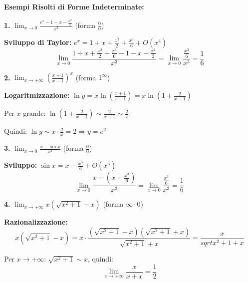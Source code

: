 \begin{esempio}
\textbf{Esempi Risolti di Forme Indeterminate:}

\textbf{1.} $\lim_{x \to 0} \frac{e^x - 1 - x - \frac{x^2}{2}}{x^3}$ (forma $\frac{0}{0}$)

\textbf{Sviluppo di Taylor:} $e^x = 1 + x + \frac{x^2}{2} + \frac{x^3}{6} + O(x^4)$
\[ \lim_{x \to 0} \frac{1 + x + \frac{x^2}{2} + \frac{x^3}{6} - 1 - x - \frac{x^2}{2}}{x^3} = \lim_{x \to 0} \frac{\frac{x^3}{6}}{x^3} = \frac{1}{6} \]

\textbf{2.} $\lim_{x \to +\infty} \left(\frac{x+1}{x-1}\right)^x$ (forma $1^{\infty}$)

\textbf{Logaritmizzazione:} $\ln y = x \ln\left(\frac{x+1}{x-1}\right) = x \ln\left(1 + \frac{2}{x-1}\right)$

Per $x$ grande: $\ln\left(1 + \frac{2}{x-1}\right) \sim \frac{2}{x-1} \sim \frac{2}{x}$

Quindi: $\ln y \sim x \cdot \frac{2}{x} = 2 \Rightarrow y = e^2$

\textbf{3.} $\lim_{x \to 0} \frac{x - \sin x}{x^3}$ (forma $\frac{0}{0}$)

\textbf{Sviluppo:} $\sin x = x - \frac{x^3}{6} + O(x^5)$
\[ \lim_{x \to 0} \frac{x - (x - \frac{x^3}{6})}{x^3} = \lim_{x \to 0} \frac{\frac{x^3}{6}}{x^3} = \frac{1}{6} \]

\textbf{4.} $\lim_{x \to +\infty} x(\sqrt{x^2 + 1} - x)$ (forma $\infty \cdot 0$)

\textbf{Razionalizzazione:}
\[ x(\sqrt{x^2 + 1} - x) = x \cdot \frac{(\sqrt{x^2 + 1} - x)(\sqrt{x^2 + 1} + x)}{\sqrt{x^2 + 1} + x} = \frac{x}{sqrt{x^2 + 1} + x} \]

Per $x \to +\infty$: $\sqrt{x^2 + 1} \sim x$, quindi:
\[ \lim_{x \to +\infty} \frac{x}{x + x} = \frac{1}{2} \]
\end{esempio}

